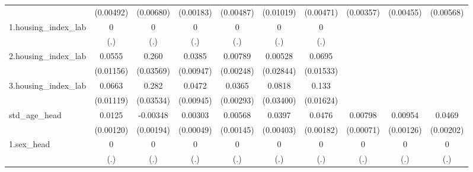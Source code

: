 \begin{table}[htbp]
{\begin{tabular}{l*{9}{c}}
            &   (0.00492)         &   (0.00680)         &   (0.00183)         &   (0.00487)         &   (0.01019)         &   (0.00471)         &   (0.00357)         &   (0.00455)         &   (0.00568)         \\
1.housing_index_lab&           0         &           0         &           0         &           0         &           0         &           0         &                     &                     &                     \\
            &         (.)         &         (.)         &         (.)         &         (.)         &         (.)         &         (.)         &                     &                     &                     \\
2.housing_index_lab&      0.0555\sym{***}&       0.260\sym{***}&      0.0385\sym{***}&     0.00789\sym{***}&     0.00528         &      0.0695\sym{***}&                     &                     &                     \\
            &   (0.01156)         &   (0.03569)         &   (0.00947)         &   (0.00248)         &   (0.02844)         &   (0.01533)         &                     &                     &                     \\
3.housing_index_lab&      0.0663\sym{***}&       0.282\sym{***}&      0.0472\sym{***}&      0.0365\sym{***}&      0.0818\sym{**} &       0.133\sym{***}&                     &                     &                     \\
            &   (0.01119)         &   (0.03534)         &   (0.00945)         &   (0.00293)         &   (0.03400)         &   (0.01624)         &                     &                     &                     \\
std_age_head&      0.0125\sym{***}&    -0.00348\sym{*}  &     0.00303\sym{***}&     0.00568\sym{***}&      0.0397\sym{***}&      0.0476\sym{***}&     0.00798\sym{***}&     0.00954\sym{***}&      0.0469\sym{***}\\
            &   (0.00120)         &   (0.00194)         &   (0.00049)         &   (0.00145)         &   (0.00403)         &   (0.00182)         &   (0.00071)         &   (0.00126)         &   (0.00202)         \\
1.sex_head  &           0         &           0         &           0         &           0         &           0         &           0         &           0         &           0         &           0         \\
            &         (.)         &         (.)         &         (.)         &         (.)         &         (.)         &         (.)         &         (.)         &         (.)         &         (.)         \\

\end{tabular}}
\end{table}
